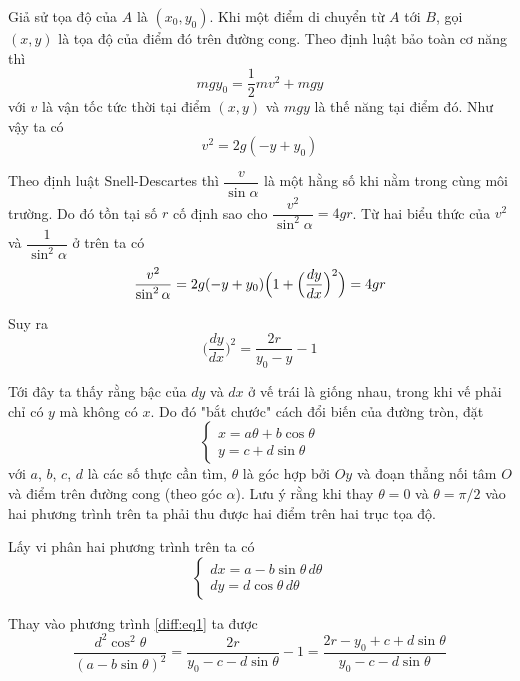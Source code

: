 Giả sử tọa độ của $A$ là $(x_0, y_0)$. Khi một điểm di chuyển từ $A$ tới $B$, gọi $(x, y)$ là tọa độ của điểm đó trên đường cong. Theo định luật bảo toàn cơ năng thì 
\begin{equation*}
    m g y_0 = \frac{1}{2} m v^2 + m g y
\end{equation*}
với $v$ là vận tốc tức thời tại điểm $(x, y)$ và $mgy$ là thế năng tại điểm đó. Như vậy ta có 
\begin{equation}
    v^2 = 2 g (-y + y_0)
\end{equation}

Theo định luật Snell-Descartes thì $\dfrac{v}{\sin \alpha}$ là một hằng số khi nằm trong cùng môi trường. Do đó tồn tại số $r$ cố định sao cho $\dfrac{v^2}{\sin^2 \alpha} = 4 g r$. Từ hai biểu thức của $v^2$ và $\dfrac{1}{\sin^2 \alpha}$ ở trên ta có
\begin{equation}
    \frac{v^2}{\sin^2 \alpha} = 2 g (-y + y_0) \Bigl( 1 + \Bigl(\frac{dy}{dx}\Bigr)^2 \Bigr) = 4 g r
\end{equation}

Suy ra
\begin{equation}
    \Big(\frac{dy}{dx}\Big)^2 = \frac{2 r}{y_0 - y} - 1
    \label{diff:eq1}
\end{equation}

Tới đây ta thấy rằng bậc của $dy$ và $dx$ ở vế trái là giống nhau, trong khi vế phải chỉ có $y$ mà không có $x$. Do đó "bắt chước" cách đổi biến của đường tròn, đặt
\begin{equation*}
    \begin{cases}
        x = a \theta + b \cos \theta \\
        y = c + d \sin \theta
    \end{cases}
\end{equation*}
với $a$, $b$, $c$, $d$ là các số thực cần tìm, $\theta$ là góc hợp bởi $Oy$ và đoạn thẳng nối tâm $O$ và điểm trên đường cong (theo góc $\alpha$). Lưu ý rằng khi thay $\theta = 0$ và $\theta = \pi / 2$ vào hai phương trình trên ta phải thu được hai điểm trên hai trục tọa độ.

Lấy vi phân hai phương trình trên ta có
\begin{equation*}
    \begin{cases}
    dx = a - b \sin \theta \, d \theta \\ dy = d \cos \theta \, d \theta
\end{cases}
\end{equation*}

Thay vào phương trình \ref{diff:eq1} ta được
\begin{equation*}
    \frac{d^2 \cos^2 \theta}{(a - b \sin \theta)^2} = \frac{2 r}{y_0 - c - d \sin \theta} - 1 = \frac{2 r - y_0 + c + d \sin \theta}{y_0 - c - d \sin \theta}
\end{equation*}


